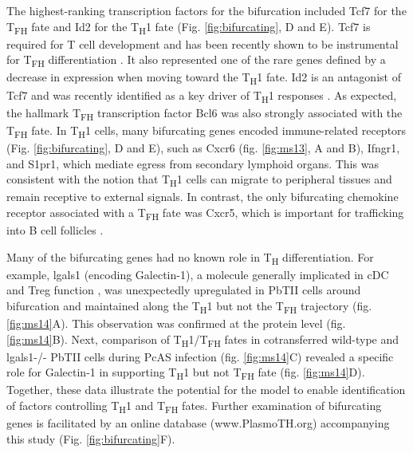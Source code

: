 The highest-ranking transcription factors for the bifurcation included Tcf7 for the T\textsubscript{FH} fate and Id2 for the T\textsubscript{H}1 fate (Fig.  \ref{fig:bifurcating}, D and E). Tcf7 is required for T cell development and has been recently shown to be instrumental for T\textsubscript{FH} differentiation \cite{Choi2015-wk, Xu2015-dc}. It also represented one of the rare genes defined by a decrease in expression when moving toward the T\textsubscript{H}1 fate. Id2 is an antagonist of Tcf7 and was recently identified as a key driver of T\textsubscript{H}1 responses \cite{Shaw2016-ya}. As expected, the hallmark T\textsubscript{FH} transcription factor Bcl6 was also strongly associated with the T\textsubscript{FH} fate. In T\textsubscript{H}1 cells, many bifurcating genes encoded immune-related receptors (Fig. \ref{fig:bifurcating}, D and E), such as Cxcr6 (fig.  \ref{fig:ms13}, A and B), Ifngr1, and S1pr1, which mediate egress from secondary lymphoid organs. This was consistent with the notion that T\textsubscript{H}1 cells can migrate to peripheral tissues and remain receptive to external signals. In contrast, the only bifurcating chemokine receptor associated with a T\textsubscript{FH} fate was Cxcr5, which is important for trafficking into B cell follicles \cite{Hardtke2005-mr}.

Many of the bifurcating genes had no known role in T\textsubscript{H} differentiation. For example, lgals1 (encoding Galectin-1), a molecule generally implicated in cDC \cite{Poncini2015-um} and Treg function \cite{Garin2007-go}, was unexpectedly upregulated in PbTII cells around bifurcation and maintained along the T\textsubscript{H}1 but not the T\textsubscript{FH} trajectory (fig.  \ref{fig:ms14}A). This observation was confirmed at the protein level (fig.  \ref{fig:ms14}B). Next, comparison of T\textsubscript{H}1/T\textsubscript{FH} fates in cotransferred wild-type and lgals1-/- PbTII cells during PcAS infection (fig.  \ref{fig:ms14}C) revealed a specific role for Galectin-1 in supporting T\textsubscript{H}1 but not T\textsubscript{FH} fate (fig.  \ref{fig:ms14}D). Together, these data illustrate the potential for the  model to enable identification of factors controlling T\textsubscript{H}1 and T\textsubscript{FH} fates. Further examination of bifurcating genes is facilitated by an online database (www.PlasmoTH.org) accompanying this study (Fig.  \ref{fig:bifurcating}F).

